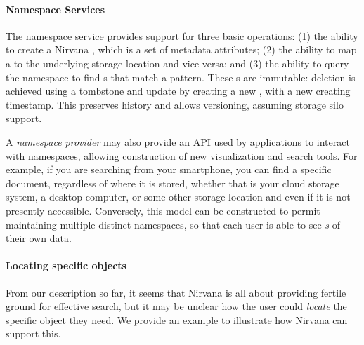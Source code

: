 
\paragraph{Namespace Services}

The namespace service provides support for three basic operations: (1) the ability to create a Nirvana \REF, which is a set of metadata attributes;
(2) the ability to map a {\REF} to the underlying storage location and vice versa; and
(3) the ability to query the namespace to find {\REF}s that match a  pattern.  These {\REF}s are immutable: deletion is achieved using a tombstone and update by creating a new {\REF}, with a new creating timestamp.  This preserves history and allows versioning, assuming storage silo support.


A \textit{namespace provider} may also provide an API used by applications to interact with namespaces, allowing construction of new visualization and search tools.
For example, if you are searching from your smartphone, you can find a specific document, regardless of where
it is stored, whether that is your cloud storage system, a desktop computer, or some other storage location and even if it is not presently accessible.
Conversely, this model can be constructed to permit maintaining multiple distinct namespaces, so that each user is able to see \emph{{\PROJECTION}s} of their own data.

\paragraph{Locating specific objects} From our description so far, it seems that Nirvana is all about providing fertile ground for effective search, but it may be unclear how the user could \textit{locate} the specific object they need. We provide an example to illustrate how Nirvana can support this.

